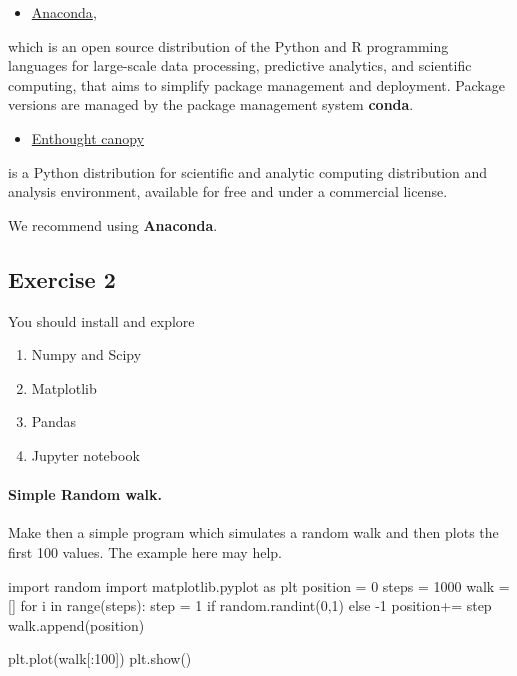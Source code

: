 \documentclass[%
oneside,                 %
final,                   %
10pt]{article}
\begin{document}
\begin{itemize}
\item \href{{https://docs.anaconda.com/}}{Anaconda}, 
\end{itemize}

\noindent
which is an open source
distribution of the Python and R programming languages for large-scale
data processing, predictive analytics, and scientific computing, that
aims to simplify package management and deployment. Package versions
are managed by the package management system \textbf{conda}. 

\begin{itemize}
\item \href{{https://www.enthought.com/product/canopy/}}{Enthought canopy} 
\end{itemize}

\noindent
is a Python
distribution for scientific and analytic computing distribution and
analysis environment, available for free and under a commercial
license.

We recommend using \textbf{Anaconda}.


\subsection*{Exercise 2}

You should install and explore
\begin{enumerate}
\item Numpy and Scipy

\item Matplotlib

\item Pandas

\item Jupyter notebook
\end{enumerate}

\noindent
\paragraph{Simple Random walk.}
Make then a simple program which simulates a random walk and then plots the first 100 values. The example here may help.
\begin{print}
import random
import matplotlib.pyplot as plt
position = 0  
steps = 1000
walk = []
for i in range(steps):     
    step = 1 if random.randint(0,1) else -1
    position+= step
    walk.append(position)

plt.plot(walk[:100])
plt.show()
\end{print}
\end{document}
